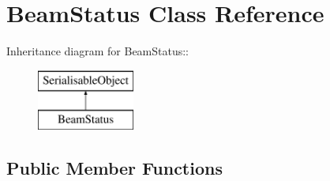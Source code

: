\hypertarget{classBeamStatus}{
\section{BeamStatus Class Reference}
\label{classBeamStatus}
}
Inheritance diagram for BeamStatus::\begin{figure}[H]
\begin{center}
\leavevmode
\includegraphics[height=2cm]{classBeamStatus}
\end{center}
\end{figure}
\subsection*{Public Member Functions}
